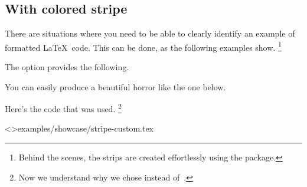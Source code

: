 \documentclass{tutodoc}
\begin{document}
\subsection{With colored stripe}

There are situations where you need to be able to clearly identify an example of formatted \LaTeX\ code. This can be done, as the following examples show.%
\footnote{
    Behind the scenes, the strips are created effortlessly using the  package.
}


\begin{tdocexa}
	The  option provides the following.

	
\end{tdocexa}


\begin{tdocexa}
	You can easily produce a beautiful horror like the one below.

	

	Here's the code that was used.%
	\footnote{
		Now we understand why we chose  instead of \,.
	}

	\tdoclatexinput<>{examples/showcase/stripe-custom.tex}
\end{tdocexa}
\end{document}
